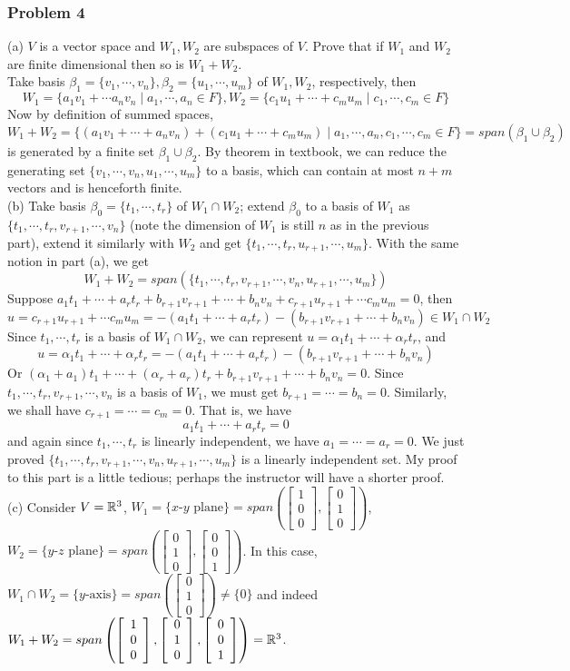 \documentclass[12pt,a4paper]{article}
\renewcommand{\l}{\left}\renewcommand{\r}{\right}
\newcommand{\trv}[3]{\l[\begin{array}{c}{#1}\\{#2}\\{#3}\end{array}\r]}
\def\R{\ifmmode\mathbb R\fi}
\begin{document}
\subsubsection*{Problem 4}
(a) $V$ is a vector space and $W_1, W_2$ are subspaces of $V$. Prove that if $W_1$ and $W_2$ are finite dimensional then so is $W_1 + W_2$. \\
Take basis $\beta_1 = \{v_1, \cdots, v_n\}, \beta_2 = \{u_1, \cdots, u_m\}$ of $W_1, W_2$, respectively, then
$$W_1 = \{a_1 v_1 + \cdots a_nv_n \mid a_1, \cdots , a_n \in F\}, W_2 = \{c_1u_1 + \cdots + c_mu_m \mid c_1, \cdots, c_m \in F\}$$
Now by definition of summed spaces, 
$$W_1 + W_2 = \{(a_1v_1 + \cdots + a_nv_n) + (c_1u_1 + \cdots + c_mu_m) \mid a_1, \cdots, a_n, c_1, \cdots, c_m \in F\} = span(\beta_1 \cup \beta_2)$$
is generated by a finite set $\beta_1 \cup \beta_2$. By theorem in textbook, we can reduce the generating set $\{v_1, \cdots, v_n, u_1, \cdots, u_m\}$ to a basis, which can contain at most $n+m$ vectors and is henceforth finite. \\
(b) Take basis $\beta_0 = \{t_1, \cdots, t_r\}$ of $W_1 \cap W_2$; extend $\beta_0$ to a basis of $W_1$ as $\{t_1, \cdots, t_r, v_{r+1}, \cdots, v_n\}$ (note the dimension of $W_1$ is still $n$ as in the previous part), extend it similarly with $W_2$ and get $\{t_1, \cdots, t_r, u_{r+1}, \cdots, u_m\}$. With the same notion in part (a), we get 
$$W_1 + W_2 = span(\{t_1, \cdots, t_r, v_{r+1}, \cdots, v_n, u_{r+1}, \cdots, u_m\})$$
Suppose $a_1t_1 + \cdots + a_rt_r + b_{r+1} v_{r+1} + \cdots + b_nv_n + c_{r+1}u_{r+1} + \cdots c_m u_m = 0$, then
$$u = c_{r+1}u_{r+1} + \cdots c_m u_m = -(a_1t_1 + \cdots + a_rt_r) - (b_{r+1} v_{r+1} + \cdots + b_nv_n) \in W_1 \cap W_2$$
Since $t_1, \cdots, t_r$ is a basis of $W_1 \cap W_2$, we can represent $u = \alpha_1 t_1 + \cdots + \alpha_r t_r$, and 
$$u = \alpha_1 t_1 + \cdots + \alpha_r t_r = -(a_1t_1 + \cdots + a_rt_r) - (b_{r+1} v_{r+1} + \cdots + b_nv_n)$$
Or $(\alpha_1+a_1) t_1 + \cdots + (\alpha_r+a_r) t_r +  b_{r+1} v_{r+1} + \cdots + b_nv_n = 0$. Since $t_1, \cdots, t_r, v_{r+1}, \cdots, v_n$ is a basis of $W_1$, we must get $b_{r+1} = \cdots = b_{n} = 0$. Similarly, we shall have $c_{r+1} = \cdots = c_m = 0$. That is, we have 
$$a_1t_1 + \cdots + a_rt_r  = 0$$
and again since $t_1, \cdots, t_r$ is linearly independent, we have $a_1 = \cdots = a_r = 0$. We just proved $\{t_1, \cdots, t_r, v_{r+1}, \cdots, v_n, u_{r+1}, \cdots, u_m\}$ is a linearly independent set. My proof to this part is a little tedious; perhaps the instructor will have a shorter proof. \\
(c) Consider $V = \R^3$, $W_1 = \{ \mbox{$x$-$y$ plane}\} = span\l(\trv100, \trv010\r)$, $W_2 = \{ \mbox{$y$-$z$ plane}\} = span\l(\trv010,\trv001\r)$. In this case, $W_1 \cap W_2 = \{ \mbox{$y$-axis}\} = span\l(\trv010\r) \neq \{0\}$ and indeed $W_1 + W_2 = span\l(\trv100,\trv010,\trv001\r) = \R^3$.
\end{document}
